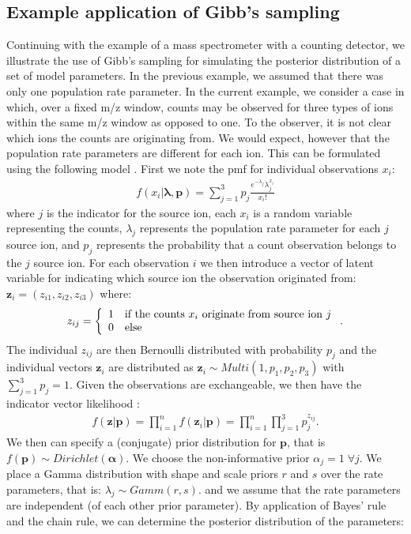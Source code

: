 \begin{DoubleSpace*}
\subsection{Example application of Gibb's sampling}
Continuing with the example of a mass spectrometer with a counting detector, we illustrate the use of Gibb's sampling for simulating the posterior distribution of a set of model parameters. In the previous example, we assumed that there was only one population rate parameter. In the current example, we consider a case in which, over a fixed m/z window, counts may be observed for three types of ions within the same m/z window as opposed to one. To the observer, it is not clear which ions the counts are originating from. We would expect, however that the population rate parameters are different for each ion. This can be formulated using the following model \cite{diebolt1994,everitt2004}. First we note the pmf for individual observations $x_i$:
\begin{align}
	f(x_i|\boldsymbol{\lambda},\textbf{p})=\sum_{j=1}^3 p_j \frac{e^{-\lambda_j} \lambda_j^{x_i}}{x_i!}
\end{align}
where $j$ is the indicator for the source ion, each $x_i$ is a random variable representing the counts, $\lambda_j$ represents the population rate parameter for each $j$ source ion, and $p_j$ represents the probability that a count observation belongs to the $j$ source ion. For each observation $i$ we then introduce a vector of latent variable for indicating which source ion the observation originated from: $\textbf{z}_i=(z_{i1}, z_{i2},z_{i3})$ where:
\begin{align}
	z_{ij}= \left\{ \begin{array}{c l}
	1 & \text{if the counts $x_i$ originate from source ion $j$}   \\ 
	0 & \text{else} 
	\end{array} \right. .
\end{align}
The individual $z_{ij}$ are then Bernoulli distributed with probability $p_j$ and the individual vectors $\textbf{z}_i$ are distributed as $\textbf{z}_{i} \sim Multi(1,p_1,p_2,p_3)$ with $\sum_{j=1}^3 p_j =1$. Given the observations are exchangeable, we then have the indicator vector likelihood :
\begin{align}
	 f(\textbf{z}|\textbf{p})= \prod_{i=1}^n f(\textbf{z}_i|\textbf{p}) = \prod_{i=1}^n \prod_{j=1}^3 p_j^{z_{ij}}.
\end{align}
We then can specify a (conjugate) prior distribution for $\textbf{p}$, that is $f(\textbf{p})\sim Dirichlet(\boldsymbol{\alpha})$. We choose the non-informative prior $\alpha_j=1 \; \forall j$. We place a Gamma distribution with shape and scale priors $r$ and $s$ over the rate parameters, that is: $\lambda_j \sim Gamm(r,s)$. and we assume that the rate parameters are independent (of each other prior parameter). By application of Bayes' rule and the chain rule, we can determine the posterior distribution of the parameters:

\end{DoubleSpace*}
